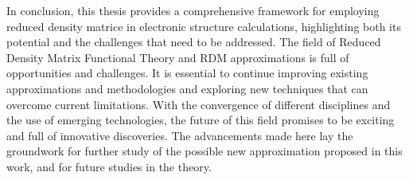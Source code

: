 In conclusion, this thesis provides a comprehensive framework for employing 
reduced density matrice in electronic structure calculations, highlighting both
its potential and the challenges that need to be addressed.
The field of Reduced Density Matrix Functional Theory and RDM approximations is
full of opportunities and challenges.
It is essential to continue improving existing 
approximations and methodologies and exploring new techniques that can overcome current limitations.
With the convergence of different disciplines and the use of emerging 
technologies, the future of this field promises to be exciting and full of 
innovative discoveries.
The advancements made here lay the groundwork for further study of the possible
new approximation proposed in this work, and for future studies in the theory.

